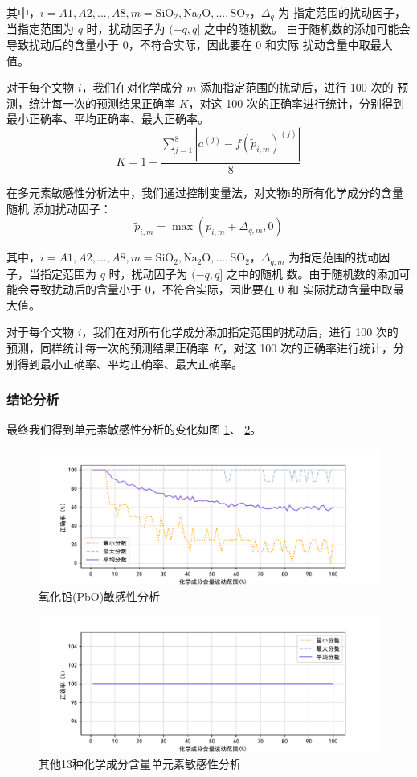 \documentclass[withoutpreface,bwprint]{cumcmthesis} %
\begin{document}
其中，$i=A1,A2,...,A8, m=\mathrm{SiO_2,Na_2O,...,SO_2}$，$\Delta_q$ 为
指定范围的扰动因子，当指定范围为 $q$ 时，扰动因子为 $(-q,q]$ 之中的随机数。
由于随机数的添加可能会导致扰动后的含量小于 0，不符合实际，因此要在 0 和实际
扰动含量中取最大值。

对于每个文物 $i$，我们在对化学成分 $m$ 添加指定范围的扰动后，进行 100 次的
预测，统计每一次的预测结果正确率 $K$，对这 100 次的正确率进行统计，分别得到
最小正确率、平均正确率、最大正确率。
\[
    K=1-\frac{\sum_{j=1}^8|a^{(j)}-f(\widetilde{p}_{i,m})^{(j)}|}{8}
\]

在多元素敏感性分析法中，我们通过控制变量法，对文物i的所有化学成分的含量随机
添加扰动因子：
\[
    \widetilde{p}_{i,m}=\max(p_{i,m}+\Delta_{q,m}, 0)
\]

其中，$i=A1,A2,...,A8,m=\mathrm{SiO_2,Na_2O,...,SO_2}$，$\Delta_{q,m}$
为指定范围的扰动因子，当指定范围为 $q$ 时，扰动因子为 $(-q,q]$ 之中的随机
数。由于随机数的添加可能会导致扰动后的含量小于 0，不符合实际，因此要在 0 和
实际扰动含量中取最大值。

对于每个文物 $i$，我们在对所有化学成分添加指定范围的扰动后，进行 100 次的
预测，同样统计每一次的预测结果正确率 $K$，对这 100 次的正确率进行统计，分
别得到最小正确率、平均正确率、最大正确率。

\subsubsection{结论分析}
最终我们得到单元素敏感性分析的变化如图 \ref{fig:PbOSensitivity}、
\ref{fig:other13kindsSensitivity}。
\begin{figure}[!htb]
    \centering
    \includegraphics[scale=0.75]{氧化铅(PbO)敏感性分析.pdf}
    \caption{氧化铅(PbO)敏感性分析}
    \label{fig:PbOSensitivity}
\end{figure}
\begin{figure}[!htb]
    \centering
    \includegraphics[scale=0.75]{其他13种化学成分含量单元素敏感性分析.pdf}
    \caption{其他13种化学成分含量单元素敏感性分析}
    \label{fig:other13kindsSensitivity}
\end{figure}
\end{document}
